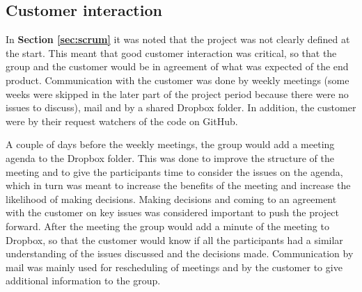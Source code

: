 \subsection{Customer interaction}

In \textbf{Section \ref{sec:scrum}} it was noted that the project was not clearly defined at the start. This meant that good customer interaction was critical, so that the group and the customer would be in agreement of what was expected of the end product. Communication with the customer was done by weekly meetings (some weeks were skipped in the later part of the project period because there were no issues to discuss), mail and by a shared Dropbox folder. In addition, the customer were by their request watchers of the code on GitHub. \newline

A couple of days before the weekly meetings, the group would add a meeting agenda to the Dropbox folder. This was done to improve the structure of the meeting and to give the participants time to consider the issues on the agenda, which in turn was meant to increase the benefits of the meeting and increase the likelihood of making decisions. Making decisions and coming to an agreement with the customer on key issues was considered important to push the project forward. After the meeting the group would add a minute of the meeting to Dropbox, so that the customer would know if all the participants had a similar understanding of the issues discussed and the decisions made. Communication by mail was mainly used for rescheduling of meetings and by the customer to give additional information to the group. 

\cleardoublepage